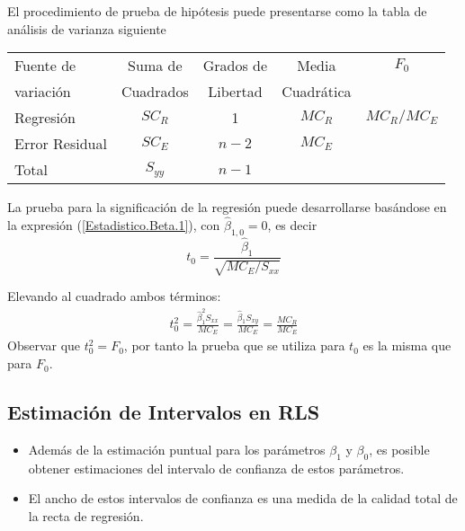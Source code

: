 El procedimiento de prueba de hip\'otesis puede presentarse como la tabla de an\'alisis de varianza siguiente\medskip






\begin{tabular}{lcccc}\hline
Fuente de & Suma de  &  Grados de  & Media  & $F_{0}$ \\ 
 variaci\'on & Cuadrados & Libertad & Cuadr\'atica & \\\hline
 Regresi\'on & $SC_{R}$ & 1 & $MC_{R}$  & $MC_{R}/MC_{E}$\\
 Error Residual & $SC_{E}$ & $n-2$ & $MC_{E}$ & \\\hline
 Total & $S_{yy}$ & $n-1$ & & \\\hline
\end{tabular} 

La prueba para la significaci\'on de la regresi\'on puede desarrollarse bas\'andose en la expresi\'on (\ref{Estadistico.Beta.1}), con $\hat{\beta}_{1,0}=0$, es decir
\begin{equation}\label{Estadistico.Beta.1.Cero}
t_{0}=\frac{\hat{\beta}_{1}}{\sqrt{MC_{E}/S_{xx}}}
\end{equation}





Elevando al cuadrado ambos t\'erminos:
\begin{eqnarray*}
t_{0}^{2}=\frac{\hat{\beta}_{1}^{2}S_{xx}}{MC_{E}}=\frac{\hat{\beta}_{1}S_{xy}}{MC_{E}}=\frac{MC_{R}}{MC_{E}}
\end{eqnarray*}
Observar que $t_{0}^{2}=F_{0}$, por tanto la prueba que se utiliza para $t_{0}$ es la misma que para $F_{0}$.




\subsection{Estimaci\'on de Intervalos en RLS}




\begin{itemize}
\item Adem\'as de la estimaci\'on puntual para los par\'ametros $\beta_{1}$ y $\beta_{0}$, es posible obtener estimaciones del intervalo de confianza de estos par\'ametros.

\item El ancho de estos intervalos de confianza es una medida de la calidad total de la recta de regresi\'on.

\end{itemize}






